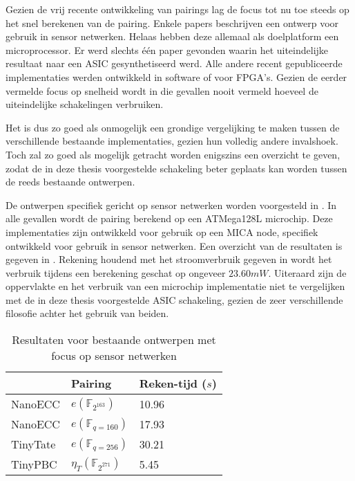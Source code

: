 Gezien de vrij recente ontwikkeling van pairings lag de focus tot nu toe steeds op het snel berekenen van de pairing. Enkele papers beschrijven een ontwerp voor gebruik in sensor netwerken. Helaas hebben deze allemaal als doelplatform een microprocessor. Er werd slechts \'e\'en paper gevonden waarin het uiteindelijke resultaat naar een ASIC gesynthetiseerd werd. Alle andere recent gepubliceerde implementaties werden ontwikkeld in software of voor FPGA's. Gezien de eerder vermelde focus op snelheid wordt in die gevallen nooit vermeld hoeveel de uiteindelijke schakelingen verbruiken.

Het is dus zo goed als onmogelijk een grondige vergelijking te maken tussen de verschillende bestaande implementaties, gezien hun volledig andere invalshoek. Toch zal zo goed als mogelijk getracht worden enigszins een overzicht te geven, zodat de in deze thesis voorgestelde schakeling beter geplaats kan worden tussen de reeds bestaande ontwerpen.

De ontwerpen specifiek gericht op sensor netwerken worden voorgesteld in \cite{tinypbc, tinytate, nanoecc}. In alle gevallen wordt de pairing berekend op een ATMega128L microchip. Deze implementaties zijn ontwikkeld voor gebruik op een MICA node, specifiek ontwikkeld voor gebruik in sensor netwerken. Een overzicht van de resultaten is gegeven in . Rekening houdend met het stroomverbruik gegeven in \cite{nanoecc} wordt het verbruik tijdens een berekening geschat op ongeveer $23.60mW$. Uiteraard zijn de oppervlakte en het verbruik van een microchip implementatie niet te vergelijken met de in deze thesis voorgestelde ASIC schakeling, gezien de zeer verschillende filosofie achter het gebruik van beiden.

\begin{table}[h]
	\caption{Resultaten voor bestaande ontwerpen met focus op sensor netwerken}
	\label{tabel-resultaten-sensor}

	\centering
	\begin{tabular}{|l|l|p{1cm}|}
		\hline
		& Pairing	&	Reken-tijd ($s$)\\
		\hline \hline
		NanoECC \cite{nanoecc}		& $e(\mathbb{F}_{2^{163}})$	& 10.96\\
		NanoECC \cite{nanoecc}		& $e(\mathbb{F}_{q = 160})$	& 17.93\\
		TinyTate \cite{tinytate}	& $e(\mathbb{F}_{q = 256})$	& 30.21\\
		TinyPBC	\cite{tinypbc}		& $\eta_T(\mathbb{F}_{2^{271}})$	& 5.45\\
		\hline		
	\end{tabular}
\end{table}

